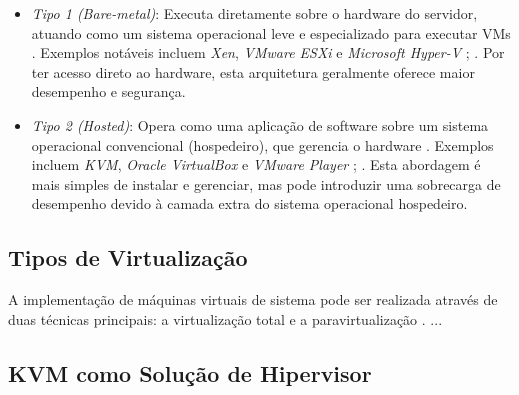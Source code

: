 \begin{itemize}
\begin{itemize}
    \item \emph{Tipo 1 (Bare-metal)}: Executa diretamente sobre o hardware do servidor, atuando como um sistema operacional leve e especializado para executar VMs \cite{chawla2025}. Exemplos notáveis incluem \textit{Xen}, \textit{VMware ESXi} e \textit{Microsoft Hyper-V} \cite{chawla2025}; \cite{carissimi2008}. Por ter acesso direto ao hardware, esta arquitetura geralmente oferece maior desempenho e segurança.
    \item \emph{Tipo 2 (Hosted)}: Opera como uma aplicação de software sobre um sistema operacional convencional (hospedeiro), que gerencia o hardware \cite{chawla2025}. Exemplos incluem \textit{KVM}, \textit{Oracle VirtualBox} e \textit{VMware Player} \cite{chawla2025}; \cite{carissimi2008}. Esta abordagem é mais simples de instalar e gerenciar, mas pode introduzir uma sobrecarga de desempenho devido à camada extra do sistema operacional hospedeiro.
\end{itemize}

\subsection{Tipos de Virtualização}
A implementação de máquinas virtuais de sistema pode ser realizada através de duas técnicas principais: a virtualização total e a paravirtualização \cite{carissimi2008}.
{{ ... }}

\subsection{KVM como Solução de Hipervisor}


\end{itemize}
